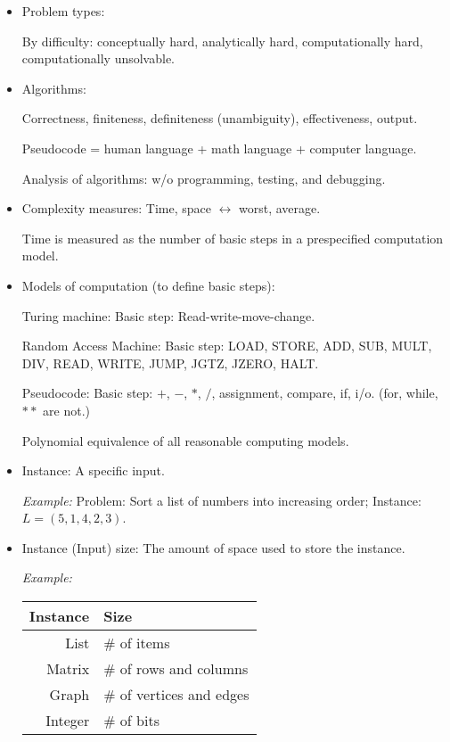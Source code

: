 \documentclass{article}
\begin{document}
\begin{itemize}

\item Problem types:


By difficulty: conceptually hard, analytically hard,
computationally hard, computationally unsolvable.

\item Algorithms:

Correctness, finiteness, definiteness (unambiguity), effectiveness, output.

Pseudocode = human language + math language + computer language.

Analysis of algorithms: w/o programming, testing, and debugging.

\item Complexity measures: Time, space $\leftrightarrow$
worst, average.

Time is measured as the number of basic steps in a prespecified
computation model.

\item Models of computation (to define basic steps):

Turing machine: Basic step: Read-write-move-change.

Random Access Machine: Basic step: LOAD, STORE, ADD, SUB, MULT, DIV,
READ, WRITE, JUMP, JGTZ, JZERO, HALT.

Pseudocode: Basic step: $+$, $-$, $*$, $/$, assignment, compare, if,
i/o. (for, while, $**$ are not.)

Polynomial equivalence of all reasonable computing models.

\item Instance: A specific input.

{\em Example:} Problem: Sort a list of numbers into increasing order;
Instance: $L=(5,1,4,2,3)$.

\item Instance (Input) size: 
The amount of space used to store the instance.

{\em Example:}
\begin{center}
\begin{tabular}{r|l}
Instance & Size\\\hline
List & \# of items \\
Matrix & \# of rows and columns \\
Graph & \# of vertices and edges \\
Integer & \# of bits
\end{tabular}
\end{center}


\end{itemize}
\end{document}
